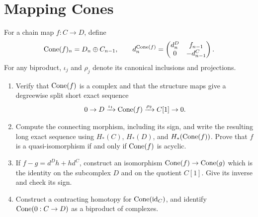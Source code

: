 \documentclass[11pt]{article}
\newcounter{result}[section]
\begin{document}
\section{Mapping Cones}\label{ex:cone}
For a chain map $f:C\to D$, define
\[
\operatorname{Cone}(f)_n=D_n\oplus C_{n-1},\qquad
 d^{\operatorname{Cone}(f)}_n=\begin{pmatrix}d^D_n&f_{n-1}\\0&-d^C_{n-1}\end{pmatrix}.
\]
For any biproduct, $\iota_j$ and $\rho_j$ denote its canonical inclusions and projections.
\begin{enumerate}
\item Verify that $\operatorname{Cone}(f)$ is a complex and that the structure maps give a degreewise split short exact sequence
\[
0\to D\xrightarrow{\iota_1}\operatorname{Cone}(f)\xrightarrow{\rho_2}C[1]\to0.
\]
\item Compute the connecting morphism, including its sign, and write the resulting long exact sequence using $H_*(C)$, $H_*(D)$, and $H_*(\operatorname{Cone}(f))$. Prove that $f$ is a quasi-isomorphism if and only if $\operatorname{Cone}(f)$ is acyclic.
\item If $f-g=d^Dh+hd^C$, construct an isomorphism $\operatorname{Cone}(f)\to\operatorname{Cone}(g)$ which is the identity on the subcomplex $D$ and on the quotient $C[1]$. Give its inverse and check its sign.
\item Construct a contracting homotopy for $\operatorname{Cone}(\mathrm{id}_C)$, and identify $\operatorname{Cone}(0:C\to D)$ as a biproduct of complexes.
\end{enumerate}
\end{document}
